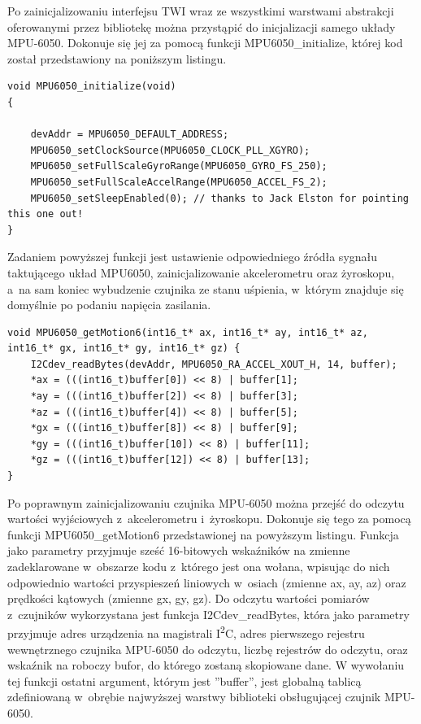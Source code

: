 \documentclass[11pt, twoside]{Thesis} %
\begin{document}
Po zainicjalizowaniu interfejsu TWI wraz ze wszystkimi warstwami abstrakcji oferowanymi przez bibliotekę można przystąpić do inicjalizacji samego układy MPU-6050. Dokonuje się jej za pomocą funkcji MPU6050\_initialize, której kod został przedstawiony na poniższym listingu.

\begin{lstlisting}
void MPU6050_initialize(void) 
{
	
	devAddr = MPU6050_DEFAULT_ADDRESS;
    MPU6050_setClockSource(MPU6050_CLOCK_PLL_XGYRO);
    MPU6050_setFullScaleGyroRange(MPU6050_GYRO_FS_250);
    MPU6050_setFullScaleAccelRange(MPU6050_ACCEL_FS_2);
    MPU6050_setSleepEnabled(0); // thanks to Jack Elston for pointing this one out!
}
\end{lstlisting}

Zadaniem powyższej funkcji jest ustawienie odpowiedniego źródła sygnału taktującego układ MPU6050, zainicjalizowanie akcelerometru oraz żyroskopu, a~na sam koniec wybudzenie czujnika ze stanu uśpienia, w~którym znajduje się domyślnie po podaniu napięcia zasilania.

\begin{lstlisting}
void MPU6050_getMotion6(int16_t* ax, int16_t* ay, int16_t* az, int16_t* gx, int16_t* gy, int16_t* gz) {
    I2Cdev_readBytes(devAddr, MPU6050_RA_ACCEL_XOUT_H, 14, buffer);
    *ax = (((int16_t)buffer[0]) << 8) | buffer[1];
    *ay = (((int16_t)buffer[2]) << 8) | buffer[3];
    *az = (((int16_t)buffer[4]) << 8) | buffer[5];
    *gx = (((int16_t)buffer[8]) << 8) | buffer[9];
    *gy = (((int16_t)buffer[10]) << 8) | buffer[11];
    *gz = (((int16_t)buffer[12]) << 8) | buffer[13];
}
\end{lstlisting}

Po poprawnym zainicjalizowaniu czujnika MPU-6050 można przejść do odczytu wartości wyjściowych z~akcelerometru i~żyroskopu. Dokonuje się tego za pomocą funkcji MPU6050\_getMotion6 przedstawionej na powyższym listingu. Funkcja jako parametry przyjmuje sześć 16-bitowych wskaźników na zmienne zadeklarowane w~obszarze kodu z~którego jest ona wołana, wpisując do nich odpowiednio wartości przyspieszeń liniowych w~osiach (zmienne ax, ay, az) oraz prędkości kątowych (zmienne gx, gy, gz). Do odczytu wartości pomiarów z~czujników wykorzystana jest funkcja I2Cdev\_readBytes, która jako parametry przyjmuje adres urządzenia na magistrali I\textsuperscript{2}C, adres pierwszego rejestru wewnętrznego czujnika MPU-6050 do odczytu, liczbę rejestrów do odczytu, oraz wskaźnik na roboczy bufor, do którego zostaną skopiowane dane. W wywołaniu tej funkcji ostatni argument, którym jest ''buffer'', jest globalną tablicą zdefiniowaną w~obrębie najwyższej warstwy biblioteki obsługującej czujnik MPU-6050.
\end{document}
